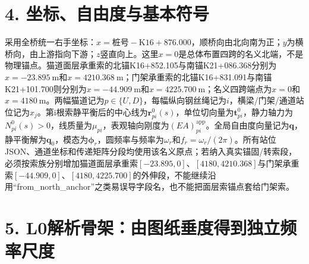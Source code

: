 \documentclass[UTF8,a4paper,11pt,fontset=none]{ctexart}
\begin{document}
\section*{4. 坐标、自由度与基本符号}
采用全桥统一右手坐标：\(x=\text{桩号}-\mathrm{K16{+}876.000}\)\allowbreak{}，顺桥向由北向南为正；\(y\)\allowbreak{}为横桥向，由上游指向下游；\(z\)\allowbreak{}竖直向上。这里\(x=0\)\allowbreak{}是总体布置四跨的名义北端，不是物理锚点。猫道面层承重索的北锚K16+852.105与南锚K21+086.368分别为\(x=-23.895\ \mathrm m\)\allowbreak{}和\(x=4210.368\ \mathrm m\)\allowbreak{}；门架承重索的北锚K16+831.091与南锚K21+101.700则分别为\(x=-44.909\ \mathrm m\)\allowbreak{}和\(x=4225.700\ \mathrm m\)\allowbreak{}；名义四跨端点为\(x=0\)\allowbreak{}和\(x=4180\ \mathrm m\)\allowbreak{}。两幅猫道记为\(p\in\{U,\allowbreak D\}\)\allowbreak{}，每幅纵向钢丝绳记为\(i\)\allowbreak{}，横梁/门架/通道站位记为\(x_j\)\allowbreak{}。第i根索静平衡后的中心线为\(\mathbf r^0_{pi}(s)\)\allowbreak{}，单位切向量为\(\mathbf t^0_{pi}\)\allowbreak{}，静力轴力为\(N^0_{pi}(s)>0\)\allowbreak{}，线质量为\(\mu_{pi}\)\allowbreak{}，表观轴向刚度为\((EA)_{pi}^{\mathrm{app}}\)\allowbreak{}。全局自由度向量记为\(\mathbf q\)\allowbreak{}，静平衡解为\(\mathbf q_0\)\allowbreak{}，模态为\(\boldsymbol\phi_r\)\allowbreak{}，圆频率与频率为\(\omega_r\)\allowbreak{}和\(f_r=\omega_r/(2\pi)\)\allowbreak{}。所有站位JSON、通道坐标和传递矩阵分段均使用该名义原点；若纳入真实锚固/转索段，必须按索族分别增加猫道面层承重索\([-23.895,\allowbreak 0]\)\allowbreak{}、\([4180,\allowbreak 4210.368]\)\allowbreak{}与门架承重索\([-44.909,\allowbreak 0]\)\allowbreak{}、\([4180,\allowbreak 4225.700]\)\allowbreak{}的外伸段，不能继续沿用“from\_north\_anchor”之类易误导字段名，也不能把面层索锚点套给门架索。\par
{}
\section*{5. L0解析骨架：由图纸垂度得到独立频率尺度}
\end{document}
